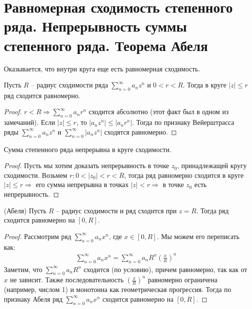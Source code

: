 \section{Равномерная сходимость степенного ряда. Непрерывность суммы степенного ряда. Теорема Абеля}
Оказывается, что внутри круга еще есть равномерная сходимость.

\begin{theorem}
    Пусть $R$ -- радиус сходимости ряда $\sum\limits_{n=0}^\infty a_nz^n$ и $0 < r < R$. 
    Тогда в круге $|z| \leqslant r$ ряд сходится равномерно.
\end{theorem}
\begin{proof}
    $r < R \Rightarrow \sum\limits_{n=0}^\infty a_nr^n$ сходится абсолютно (этот факт был в одном из замечаний).
    Если $|z| \leqslant r$, то $|a_nz^n| \leqslant |a_nr^n|$. 
    Тогда по признаку Вейерштрасса ряды $\sum\limits_{n=0}^\infty a_nz^n$ и $\sum\limits_{n=0}^\infty |a_nz^n|$ сходятся равномерно.
\end{proof}
\begin{follow}
    Сумма степенного ряда непрерывна в круге сходимости.
\end{follow}
\begin{proof}
    Пусть мы хотим доказать непрерывность в точке $z_0$, принадлежащей кругу сходимости.
    Возьмем $r: 0 < |z_0| < r < R$, тогда ряд равномерно сходится в круге $|z| \leqslant r \Rightarrow$ его сумма непрерывна в точках $|z| < r \Rightarrow$ в точке $z_0$ есть непрерывность.
\end{proof}

\begin{theorem} (Абеля) \;
    Пусть $R$ -- радиус сходимости и ряд сходится при $z = R$. 
    Тогда ряд сходится равномерно на $[0, R]$.
\end{theorem}
\begin{proof}
    Рассмотрим ряд $\sum\limits_{n = 0}^\infty a_n x^n$, где $x \in [0, R]$.
    Мы можем его переписать как:
    \begin{gather*}
        \sum\limits_{n = 0}^\infty a_n x^n = \sum\limits_{n = 0}^\infty a_n R^n \left(\frac{x}{R}\right)^n
    \end{gather*}
    Заметим, что $\sum\limits_{n = 0}^\infty a_n R^n$ сходится (по условию), причем равномерно, так как от $x$ не зависит. 
    Также последовательность $(\frac{x}{R})^n$ равномерно ограничена (например, числом 1) и монотонна как геометрическая прогрессия. 
    Тогда по признаку Абеля ряд $\sum\limits_{n = 0}^\infty a_n x^n$ сходится равномерно на $[0, R]$.
\end{proof}

